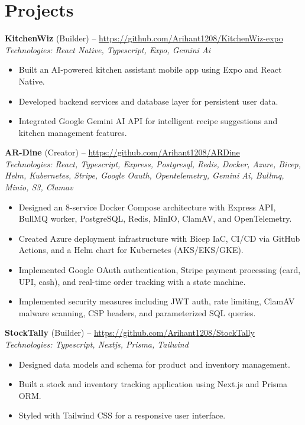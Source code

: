 \documentclass[11pt,a4paper]{article}
\begin{document}
\section{Projects}
\textbf{KitchenWiz} (Builder) -- \href{https://github.com/Arihant1208/KitchenWiz-expo}{https://github.com/Arihant1208/KitchenWiz-expo}
\\ \textit{Technologies: React Native, Typescript, Expo, Gemini Ai}
\begin{itemize}
  \item Built an AI-powered kitchen assistant mobile app using Expo and React Native.
  \item Developed backend services and database layer for persistent user data.
  \item Integrated Google Gemini AI API for intelligent recipe suggestions and kitchen management features.
\end{itemize}
\vspace{2pt}
\textbf{AR-Dine} (Creator) -- \href{https://github.com/Arihant1208/ARDine}{https://github.com/Arihant1208/ARDine}
\\ \textit{Technologies: React, Typescript, Express, Postgresql, Redis, Docker, Azure, Bicep, Helm, Kubernetes, Stripe, Google Oauth, Opentelemetry, Gemini Ai, Bullmq, Minio, S3, Clamav}
\begin{itemize}
  \item Designed an 8-service Docker Compose architecture with Express API, BullMQ worker, PostgreSQL, Redis, MinIO, ClamAV, and OpenTelemetry.
  \item Created Azure deployment infrastructure with Bicep IaC, CI/CD via GitHub Actions, and a Helm chart for Kubernetes (AKS/EKS/GKE).
  \item Implemented Google OAuth authentication, Stripe payment processing (card, UPI, cash), and real-time order tracking with a state machine.
  \item Implemented security measures including JWT auth, rate limiting, ClamAV malware scanning, CSP headers, and parameterized SQL queries.
\end{itemize}
\vspace{2pt}
\textbf{StockTally} (Builder) -- \href{https://github.com/Arihant1208/StockTally}{https://github.com/Arihant1208/StockTally}
\\ \textit{Technologies: Typescript, Nextjs, Prisma, Tailwind}
\begin{itemize}
  \item Designed data models and schema for product and inventory management.
  \item Built a stock and inventory tracking application using Next.js and Prisma ORM.
  \item Styled with Tailwind CSS for a responsive user interface.
\end{itemize}
\vspace{2pt}
\end{document}
